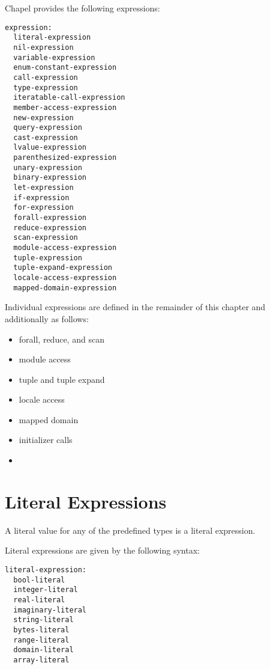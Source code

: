 \label{Expressions}

Chapel provides the following expressions:

\begin{syntax}
\begin{verbatim}
expression:
  literal-expression
  nil-expression
  variable-expression
  enum-constant-expression
  call-expression
  type-expression
  iteratable-call-expression
  member-access-expression
  new-expression
  query-expression
  cast-expression
  lvalue-expression
  parenthesized-expression
  unary-expression
  binary-expression
  let-expression
  if-expression
  for-expression
  forall-expression
  reduce-expression
  scan-expression
  module-access-expression
  tuple-expression
  tuple-expand-expression
  locale-access-expression
  mapped-domain-expression
\end{verbatim}
\end{syntax}

Individual expressions are defined in the remainder of this chapter
and additionally as follows:

\begin{itemize}
\item forall, reduce, and scan 
\item module access 
\item tuple and tuple expand 
\item locale access 
\item mapped domain 
\item initializer calls 
\item {} 
\end{itemize}

\section{Literal Expressions}
\label{Literal_Expressions}

A literal value for any of the predefined types is a literal expression.

Literal expressions are given by the following syntax:
\begin{syntax}
\begin{verbatim}
literal-expression:
  bool-literal
  integer-literal
  real-literal
  imaginary-literal
  string-literal
  bytes-literal
  range-literal
  domain-literal
  array-literal
\end{verbatim}
\end{syntax}

